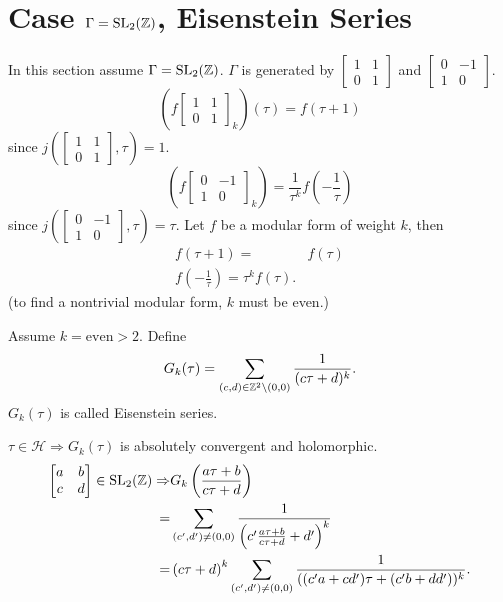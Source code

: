\section{Case $\Gamma=\operatorname{SL}_2(\mathbb{Z})$, Eisenstein Series}
In this section assume $\Gamma=\operatorname{SL}_2(\mathbb{Z})$. $\Gamma$ is generated by $\begin{bmatrix} 1&1\\0&1 \end{bmatrix} $ and $\begin{bmatrix} 0 &-1\\1&0 \end{bmatrix} $.
\[
  \left( f\begin{bmatrix} 1&1\\0&1 \end{bmatrix} _k \right) (\tau)=f(\tau+1)
  \] since $j\left( \begin{bmatrix} 1&1\\0&1 \end{bmatrix},\tau  \right)=1 $.
  \[
    \left( f\begin{bmatrix} 0&-1\\1&0 \end{bmatrix}_k  \right)= \frac{1}{\tau^{k}}f\left( -\frac{1}{\tau} \right)  
    \] since $j\left( \begin{bmatrix} 0&-1\\1&0 \end{bmatrix} ,\tau \right) =\tau$.
    Let  $f$ be a modular form of weight $k$, then
    \begin{align*}
      f(\tau+1)=&f(\tau)\\
      f\left( -\frac{1}{\tau} \right) =\tau^{k}f(\tau)
    .\end{align*}
    (to find a nontrivial modular form, $k$ must be even.)
    \begin{definition}
      Assume $k=\text{even}>2$. Define 
      \[
	G_k(\tau)=\sum_{(c,d)\in \mathbb{Z}^2\backslash (0,0)}^{} \frac{1}{(c\tau+d)^k}.
      \] 
      $G_k(\tau)$ is called Eisenstein series.
    \end{definition}
    $\tau \in \mathcal{H}\Rightarrow G_k(\tau)$ is absolutely convergent and holomorphic.
    \begin{align*}
      \begin{bmatrix} a&b\\c&d \end{bmatrix} \in \operatorname{SL}_2(\mathbb{Z})\Rightarrow&G_k\left( \frac{a\tau+b}{c\tau+d} \right)\\
      =&\sum_{(c',d')\neq (0,0)}^{} \frac{1}{\left( c' \frac{a\tau+b}{c\tau+d}+d' \right)^{k} }\\
      =&\left( c\tau+d \right) ^{k}\sum_{(c',d')\neq(0,0)}^{} \frac{1}{((c'a+cd')\tau+(c'b+d d'))^{k}}
    .\end{align*}
